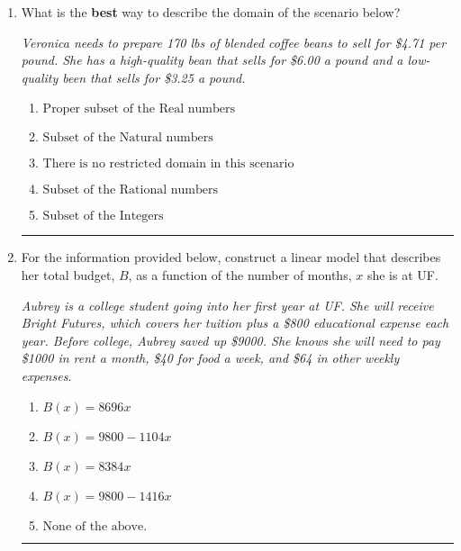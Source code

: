 \documentclass[14pt]{extbook}
\newcommand{\litem}[1]{\item#1\hspace*{-1cm}\rule{\textwidth}{0.4pt}}
\begin{document}
\begin{enumerate}
{\begin{enumerate}[label=\Alph*.]
\end{enumerate} }
\litem{
What is the \textbf{best} way to describe the domain of the scenario below?
\begin{center}
    \textit{ Veronica needs to prepare 170 lbs of blended coffee beans to sell for \$4.71 per pound. She has a high-quality bean that sells for \$6.00 a pound and a low-quality been that sells for \$3.25 a pound. }
\end{center}
\begin{enumerate}[label=\Alph*.]
\item \( \text{Proper subset of the Real numbers} \)
\item \( \text{Subset of the Natural numbers} \)
\item \( \text{There is no restricted domain in this scenario} \)
\item \( \text{Subset of the Rational numbers} \)
\item \( \text{Subset of the Integers} \)

\end{enumerate} }
\litem{
For the information provided below, construct a linear model that describes her total budget, $B$, as a function of the number of months, $x$ she is at UF.
\begin{center}
    \textit{ Aubrey is a college student going into her first year at UF. She will receive Bright Futures, which covers her tuition plus a \$800 educational expense each year. Before college, Aubrey saved up \$9000. She knows she will need to pay \$1000 in rent a month, \$40 for food a week, and \$64 in other weekly expenses. }
\end{center}
\begin{enumerate}[label=\Alph*.]
\item \( B(x) = 8696 x \)
\item \( B(x) = 9800 - 1104 x \)
\item \( B(x) = 8384 x \)
\item \( B(x) = 9800 - 1416 x \)
\item \( \text{None of the above.} \)


\end{enumerate}}
\end{enumerate}
\end{document}
